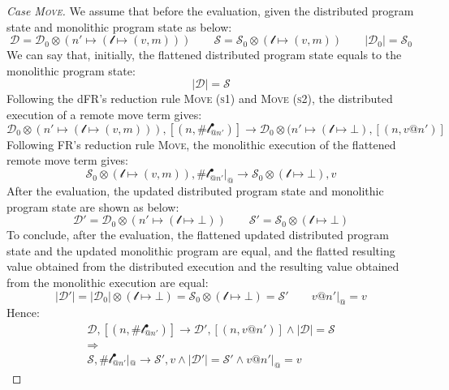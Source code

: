 \begin{proof}[Case \textsc{\emph{Move}}]
We assume that before the evaluation, given the distributed program state and monolithic program state as below:
\[\mathcal{D} = \mathcal{D}_0 \otimes (n' \mapsto (\mathscr{l}\mapsto (v, m)))\quad\quad
\mathcal{S} = \mathcal{S}_0 \otimes (\mathscr{l} \mapsto (v, m))\quad\quad
|\mathcal{D}_0| = \mathcal{S}_0\]
We can say that, initially, the flattened distributed program state equals to the monolithic program state:
\[|\mathcal{D}| = \mathcal{S}\]
Following the dFR's reduction rule \textsc{Move (s1)} and \textsc{Move (s2)}, the distributed execution of a remote move term gives:
\[\mathcal{D}_0 \otimes (n' \mapsto (\mathscr{l} \mapsto (v,m))) , [(n, \#\mathscr{l}^\bullet_{@n'})] \longrightarrow \mathcal{D}_0 \otimes (n' \mapsto (\mathscr{l} \mapsto \bot), [(n, v@n')]\]
Following FR's reduction rule \textsc{Move}, the monolithic execution of the flattened remote move term gives:
\[\mathcal{S}_0 \otimes (\mathscr{l} \mapsto (v, m)), \#\mathscr{l}^\bullet_{@n'}|_@ \longrightarrow \mathcal{S}_0 \otimes (\mathscr{l} \mapsto \bot), v\]
After the evaluation, the updated distributed program state and monolithic program state are shown as below:
\[\mathcal{D}' = \mathcal{D}_0 \otimes (n' \mapsto (\mathscr{l} \mapsto \bot)) \quad\quad \mathcal{S}' = \mathcal{S}_0 \otimes (\mathscr{l} \mapsto \bot)\]
To conclude, after the evaluation, the flattened updated distributed program state and the updated monolithic program are equal, and the flatted resulting value obtained from the distributed execution and the resulting value obtained from the monolithic execution are equal:
\[|\mathcal{D}'| = |\mathcal{D}_0| \otimes (\mathscr{l} \mapsto \bot) = \mathcal{S}_0 \otimes (\mathscr{l} \mapsto \bot) = \mathcal{S}' \quad\quad v@n'|_@ = v\]
Hence:
\begin{gather*}
\mathcal{D}, [(n, \#\mathscr{l}^\bullet_{@n'})] \longrightarrow \mathcal{D'}, [(n, v@n')] \land |\mathcal{D}| = \mathcal{S} \\\Rightarrow\\ \mathcal{S},  \#\mathscr{l}^\bullet_{@n'}|_@ \longrightarrow \mathcal{S'}, v \land |\mathcal{D}'| = \mathcal{S}' \land v@n'|_@ = v
\end{gather*}

\end{proof}
